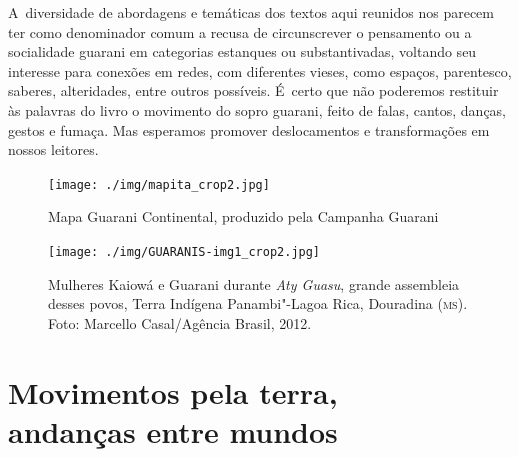 \begin{samepage}
A~diversidade de abordagens e temáticas dos textos aqui reunidos nos
parecem ter como denominador comum a recusa de circunscrever o
pensamento ou a socialidade guarani em categorias estanques ou
substantivadas, voltando seu interesse para conexões em redes, com
diferentes vieses, como espaços, parentesco, saberes, alteridades,
entre outros possíveis. É~certo que não poderemos restituir às palavras
do livro o movimento do sopro guarani, feito de falas, cantos, danças,
gestos e fumaça. Mas esperamos promover deslocamentos e transformações
em nossos leitores. 
\end{samepage}

\pagebreak

\begin{absolutelynopagebreak}
\begin{vplace}
\begin{figure}[H]
\begin{adjustwidth}{-2.4cm}{}
  \vspace{-3.1cm}
  \texttt{[image: ./img/mapita\_crop2.jpg]}	
\end{adjustwidth}
  \caption{Mapa Guarani Continental, produzido pela Campanha Guarani}
\end{figure}
\end{vplace}

\thispagestyle{empty}
\end{absolutelynopagebreak}

\pagebreak

\begin{absolutelynopagebreak}
\begin{vplace}
\begin{figure}[H]
\begin{adjustwidth}{-2.7cm}{}
  \vspace{-3.1cm}
  \texttt{[image: ./img/GUARANIS-img1\_crop2.jpg]}	
\end{adjustwidth}
  \caption{Mulheres Kaiowá e Guarani durante \emph{Aty Guasu}, grande assembleia desses
povos, Terra Indígena Panambi"-Lagoa Rica, Douradina (\textsc{ms}). Foto:
Marcello Casal/Agência Brasil, 2012.}
\end{figure}
\end{vplace}

\thispagestyle{empty}
\end{absolutelynopagebreak}

\makeatletter\@openrightfalse
\movetooddpage
\part{Movimentos pela terra,\\ andanças entre mundos}

